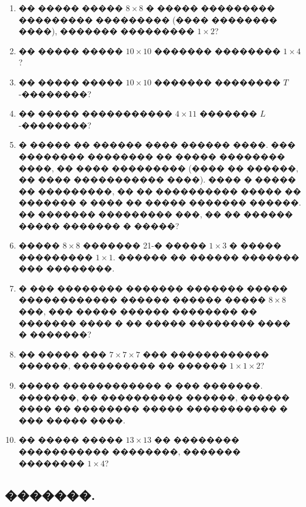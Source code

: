 \documentclass[a4paper,12pt]{article}
\begin{document}
\begin{enumerate}
\item �� ����� ����� $8\times 8$ � ����� ��������� ��������� ��������� (���� �������� ����), ������� ��������� $1\times 2$?

\item �� ����� ����� $10\times 10$ ������� �������� $1\times 4$?

\item �� ����� ����� $10\times 10$ ������� �������� $T$-��������?

\item �� ����� ����������� $4\times 11$ ������� $L$-��������?

\item � ����� �� ������ ���� ������ ����. ��� �������� �������� �� ����� �������� ����, �� ���� ��������� (���� �� ������, �� ���� ����������� ����). ���� � ����� �� ���������, �� �� ���������� ����� �� ������� � ���� �� ����� ������� ������. �� ������� ��������� ���, �� �� ������ ����� ������� � �����?

\item ����� $8\times 8$ ������� 21-� ����� $1\times 3$ � ����� ��������� $1\times 1$. ������ �� ������ ������� ��� ��������.

\item � ��� �������� ������� ������� ����� ������������ ������ ������ ����� $8\times 8$ ���, ��� ����� ������ �������� �� ������� ���� � �� ����� �������� ���� � �������?

\item �� ����� ��� $7\times 7 \times 7$ ��� ������������ ������, ���������� �� ������ $1\times 1\times 2$?

\item ����� ������������ � ��� �������. �������, �� ���������� ������, ������ ���� �� �������� ����� ����������� � ��� ����� ����.

\item �� ����� ����� $13\times 13$ �� �������� ����������� ��������, ������� �������� $1\times 4$?
\end{enumerate}






\newpage

\begin{center}
\section*{�������.}
\end{center}
\end{document}
